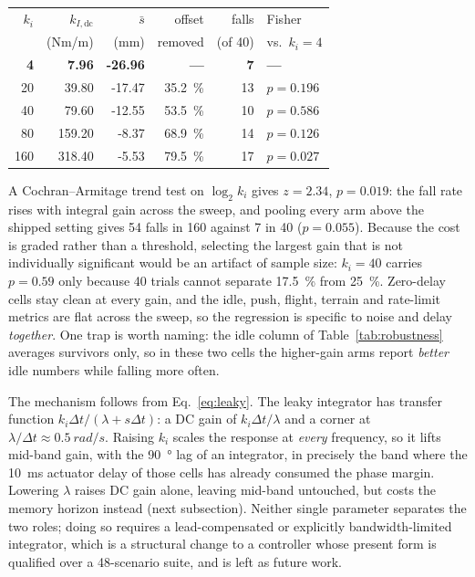 \documentclass[a4paper,fleqn]{cas-dc}
\begin{document}
\begin{center}\footnotesize
\begin{tabular}{rrrrrl}
\hline
$k_i$ & $k_{I,\text{dc}}$ & $\bar{s}$ & offset & falls & Fisher \\
 & (Nm/m) & (mm) & removed & (of 40) & vs.\ $k_i{=}4$ \\
\hline
\textbf{4} & \textbf{7.96} & \textbf{-26.96} & \textbf{---} & \textbf{7} & \textbf{---} \\
20 & 39.80 & -17.47 & \SI{35.2}{\percent} & 13 & $p{=}0.196$ \\
40 & 79.60 & -12.55 & \SI{53.5}{\percent} & 10 & $p{=}0.586$ \\
80 & 159.20 & -8.37 & \SI{68.9}{\percent} & 14 & $p{=}0.126$ \\
160 & 318.40 & -5.53 & \SI{79.5}{\percent} & 17 & $p{=}0.027$ \\
\hline
\end{tabular}
\end{center}

A Cochran--Armitage trend test on $\log_2 k_i$ gives $z{=}2.34$, $p{=}0.019$:
the fall rate rises with integral gain across the sweep, and pooling every
arm above the shipped setting gives \num{54} falls in \num{160} against
\num{7} in \num{40} ($p{=}0.055$). Because the cost is graded rather than a
threshold, selecting the largest gain that is not individually significant
would be an artifact of sample size: $k_i{=}40$ carries $p{=}0.59$ only
because \num{40} trials cannot separate \SI{17.5}{\percent} from
\SI{25}{\percent}. Zero-delay cells stay clean at every gain, and the idle,
push, flight, terrain and rate-limit metrics are flat across the sweep, so
the regression is specific to noise and delay \emph{together}. One trap is
worth naming: the idle column of Table~\ref{tab:robustness} averages
survivors only, so in these two cells the higher-gain arms report
\emph{better} idle numbers while falling more often.

The mechanism follows from Eq.~\eqref{eq:leaky}. The leaky integrator has
transfer function $k_i\Delta t/(\lambda + s\Delta t)$: a DC gain of
$k_i\Delta t/\lambda$ and a corner at $\lambda/\Delta t\approx\SI{0.5}{rad/s}$.
Raising $k_i$ scales the response at \emph{every} frequency, so it lifts mid-band gain, with the \SI{90}{\degree} lag of an integrator, in precisely the band where the \SI{10}{ms} actuator delay of those cells has already
consumed the phase margin. Lowering $\lambda$ raises DC gain alone, leaving mid-band
untouched, but costs the memory horizon instead (next subsection). Neither
single parameter separates the two roles; doing so requires a lead-compensated
or explicitly bandwidth-limited integrator, which is a structural change to a
controller whose present form is qualified over a \num{48}-scenario suite, and
is left as future work.
\end{document}
